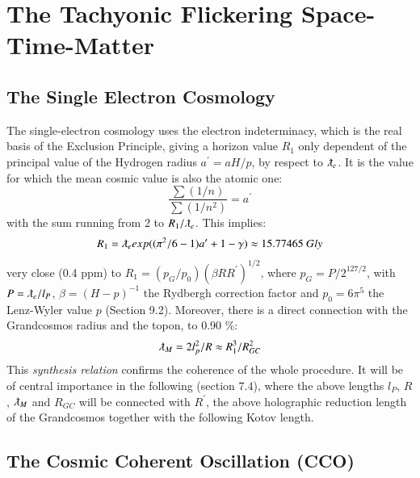 \documentclass[twoside,draft]{article}
\begin{document}
\begin{sloppypar}
\section{The Tachyonic Flickering Space-Time-Matter}

\subsection{The Single Electron Cosmology}

The single-electron cosmology \cite{Sanchez1} uses the electron indeterminacy, which is the real basis of the Exclusion Principle, giving a horizon value $R_1$ only dependent of the principal value of the Hydrogen radius $a^{\prime} = aH/p$, by respect to $\lambdabar_e$. It is the value for which the mean cosmic value is also the atomic one:
\begin{equation}
\frac{\sum(1/n)}{\sum(1/n^{2})} = a^{\prime}
\end{equation}
with the sum running from 2 to $R_{1} /\lambdabar_{e}$. This implies:
$$
R_{1} = \lambdabar_{e} exp((\pi^{2} /6 - 1)a^{\prime} + 1 - \gamma) \approx 15.77465 ~ Gly
$$
very close (0.4 ppm) to $R_{1} = ( p_{G} /p_{0} )(\beta R R^{\prime})^{1/2}$, where $p_{G} = P/2^{127/2}$, with $P = \lambdabar_e / l_P$, $\beta = (H - p)^{-1}$ the Rydbergh correction factor and $p_{0} = 6\pi^{5}$ the Lenz-Wyler value $p$ (Section 9.2). Moreover, there is a direct connection with the Grandcosmos radius and the topon, to 0.90 \%:
\begin{equation}
\lambdabar_M = 2l_p^2/R \approx R_1^3/R_{GC}^2
\end{equation}  
This \textit{synthesis relation} confirms the coherence of the whole procedure. It will be of central importance in the following (section 7.4), where the above lengths $l_P$, $R$, $\lambdabar_M$ and $R_{GC}$ will be connected with $R^{\prime}$, the above holographic reduction length of the Grandcosmos together with the following Kotov length.

\subsection{The Cosmic Coherent Oscillation (CCO)}


\end{sloppypar}
\end{document}
